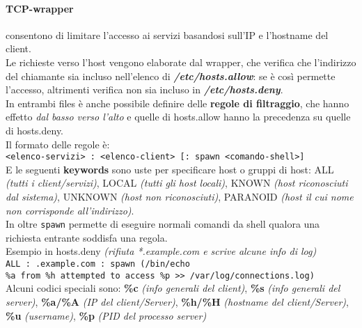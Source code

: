 \documentclass[a4paper,11pt]{article}
\def\code#1{\texttt{#1}}
\begin{document}
\paragraph{TCP-wrapper} consentono di limitare l'accesso ai servizi basandosi sull'IP e l'hostname del client. \\
Le richieste verso l'host vengono elaborate dal wrapper, che verifica che l'indirizzo del chiamante sia incluso nell'elenco di \textbf{\textit{/etc/hosts.allow}}: se è così permette l'accesso, altrimenti verifica non sia incluso in \textit{\textbf{/etc/hosts.deny}}.\\
In entrambi files è anche possibile definire delle \textbf{regole di filtraggio}, che hanno effetto \textit{dal basso verso l'alto} e quelle di hosts.allow hanno la precedenza su quelle di hosts.deny.\\
Il formato delle regole è:\\
\code{<elenco-servizi> : <elenco-client> [: spawn <comando-shell>]}\\
E le seguenti \textbf{keywords} sono uste per specificare host o gruppi di host: ALL \textit{(tutti i client/servizi)}, LOCAL \textit{(tutti gli host locali)}, KNOWN \textit{(host riconosciuti dal sistema)}, UNKNOWN \textit{(host non riconosciuti)}, PARANOID \textit{(host il cui nome non corrisponde all'indirizzo)}.\\
In oltre \code{spawn} permette di eseguire normali comandi da shell qualora una richiesta entrante soddisfa una regola.\\
Esempio in hosts.deny \textit{(rifiuta *.example.com e scrive alcune info di log)}\\ \code{ALL : .example.com : spawn (/bin/echo \\ \%a from \%h attempted to access \%p >> /var/log/connections.log)}\\
Alcuni codici speciali sono: \textbf{\%c} \textit{(info generali del client)}, \textbf{\%s} \textit{(info generali del server)}, \textbf{\%a/\%A} \textit{(IP del client/Server)}, \textbf{\%h/\%H} \textit{(hostname del client/Server)}, \textbf{\%u} \textit{(username)}, \textbf{\%p} \textit{(PID del processo server)}
\end{document}
